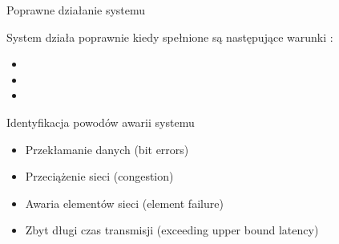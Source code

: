 \documentclass[compress,red]{beamer}
\begin{document}
\begin{frame}{Poprawne działanie systemu}


  System działa poprawnie kiedy spełnione są następujące warunki :
  
  \begin{itemize}
    \item \color{blue}{Wszystkie odbiorniki (nodes) są z synchronizowane z wymaganą dokładnością}
    \item  \color{red}{Wszystkie odbiorniki (nodes) otrzymują dane kontrolne (Control Messages)}
    \item  \color{red}{Dane kontrolne (Control Messages) docierają do wszystkich odbiorników (nodes)
          w czasie mniejszym niż wymagana maksymalna latencja.}
  \end{itemize}

\end{frame}
\begin{frame}{Identyfikacja powodów awarii systemu}


  \begin{itemize}
    \item Przekłamanie danych (bit errors)
    \item Przeciążenie sieci (congestion)
    \item Awaria elementów sieci (element failure)
    \item Zbyt długi czas transmisji (exceeding upper bound latency)
  \end{itemize}

\end{frame}
\end{document}
